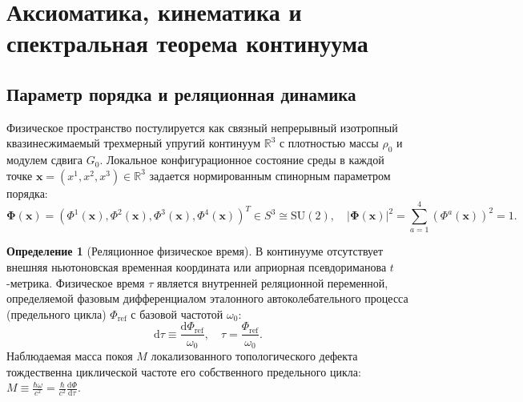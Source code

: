 \documentclass[11pt,a4paper]{article}
\theoremstyle{definition}
\newtheorem{definition}{Определение}[section]
\theoremstyle{remark}
\begin{document}
\section{Аксиоматика, кинематика и спектральная теорема континуума}
\label{sec:axiomatics}

\subsection{Параметр порядка и реляционная динамика}
Физическое пространство постулируется как связный непрерывный изотропный квазинесжимаемый трехмерный упругий континуум $\mathbb{R}^3$ с плотностью массы $\rho_0$ и модулем сдвига $G_0$. Локальное конфигурационное состояние среды в каждой точке $\mathbf{x} = (x^1, x^2, x^3) \in \mathbb{R}^3$ задается нормированным спинорным параметром порядка:
\begin{equation}
    \boldsymbol{\Phi}(\mathbf{x}) = \left(\Phi^1(\mathbf{x}), \Phi^2(\mathbf{x}), \Phi^3(\mathbf{x}), \Phi^4(\mathbf{x})\right)^T \in S^3 \cong \mathrm{SU}(2), \quad |\boldsymbol{\Phi}(\mathbf{x})|^2 = \sum_{a=1}^4 (\Phi^a(\mathbf{x}))^2 = 1.
    \label{eq:order_parameter}
\end{equation}

\begin{definition}[Реляционное физическое время]
В континууме отсутствует внешняя ньютоновская временная координата или априорная псевдориманова $t$-метрика. Физическое время $\tau$ является внутренней реляционной переменной, определяемой фазовым дифференциалом эталонного автоколебательного процесса (предельного цикла) $\Phi_{\mathrm{ref}}$ с базовой частотой $\omega_0$:
\begin{equation}
    \mathrm{d}\tau \equiv \frac{\mathrm{d}\Phi_{\mathrm{ref}}}{\omega_0}, \quad \tau = \frac{\Phi_{\mathrm{ref}}}{\omega_0}.
    \label{eq:relational_time}
\end{equation}
Наблюдаемая масса покоя $M$ локализованного топологического дефекта тождественна циклической частоте его собственного предельного цикла: $M \equiv \frac{\hbar \omega}{c^2} = \frac{\hbar}{c^2} \frac{\mathrm{d}\Phi}{\mathrm{d}\tau}$.
\end{definition}
\end{document}
